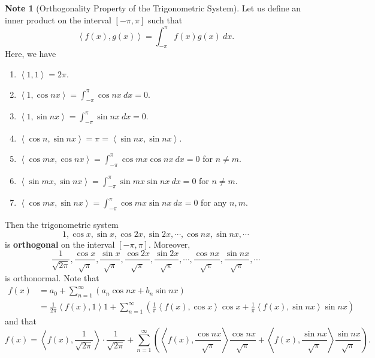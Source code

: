 \documentclass[12pt,openany]{book}
\theoremstyle{definition}
\newtheorem*{note}{Note}
\newcommand{\of}[1]{\left( #1 \right)}
\newcommand{\inner}[1]{\left\langle #1 \right\rangle}
\begin{document}
	\begin{note}[Orthogonality Property of the Trigonometric System]
		Let us define an inner product on the interval $[-\pi,\pi]$ such that \[
			\inner{f(x),g(x)}=\int_{-\pi}^{\pi}f(x)g(x)\ dx.
			\] Here, we have \begin{enumerate}[(1)]
			\item $\displaystyle\inner{1,1}=2\pi$.
			\item $\displaystyle\inner{1,\cos nx}=\int_{-\pi}^{\pi}\cos nx\ dx=0$.
			\item $\displaystyle\inner{1,\sin nx}=\int_{-\pi}^{\pi}\sin nx\ dx=0$.
			\item $\displaystyle\inner{\cos n,\sin nx}=\pi=\inner{\sin nx, \sin nx}$.
			\item $\displaystyle\inner{\cos mx,\cos nx}=\int_{-\pi}^{\pi}\cos mx\cos nx\ dx=0$ for $n\neq m$.
			\item $\displaystyle\inner{\sin mx,\sin nx}=\int_{-\pi}^{\pi}\sin mx\sin nx\ dx=0$ for $n\neq m$.
			\item $\displaystyle\inner{\cos mx,\sin nx}=\int_{-\pi}^{\pi}\cos mx\sin nx\ dx=0$ for any $n, m$.
			\end{enumerate} Then the trigonometric system \[
			1,\cos x,\sin x,\cos 2x,\sin 2x,\cdots,\cos nx,\sin nx,\cdots
			\] is \textbf{orthogonal} on the interval $[-\pi,\pi]$. Moreover, \[
			\frac{1}{\sqrt{2\pi}},\frac{\cos x}{\sqrt{\pi}},\frac{\sin x}{\sqrt{\pi}},\frac{\cos 2x}{\sqrt{\pi}},\frac{\sin 2x}{\sqrt{\pi}},\cdots,\frac{\cos nx}{\sqrt{\pi}},\frac{\sin nx}{\sqrt{\pi}},\cdots
			\] is orthonormal. Note that \begin{align*}
			f(x)&=a_0+\sum_{n=1}^\infty\of{a_n\cos nx+b_n\sin nx}\\
			&=\frac{1}{2\pi}\inner{f(x),1}1+\sum_{n=1}^\infty\of{\frac{1}{\pi}\inner{f(x),\cos x}\cos x+\frac{1}{\pi}\inner{f(x),\sin nx}\sin nx}
			\end{align*} and that \[
			f(x)=\inner{f(x),\frac{1}{\sqrt{2\pi}}}\cdot\frac{1}{\sqrt{2\pi}}+\sum_{n=1}^\infty\of{\inner{f(x),\frac{\cos nx}{\sqrt{\pi}}}\frac{\cos nx}{\sqrt{\pi}}+\inner{f(x),\frac{\sin nx}{\sqrt{\pi}}}\frac{\sin nx}{\sqrt{\pi}}}.
			\]
	\end{note}
	\newpage
\end{document}
